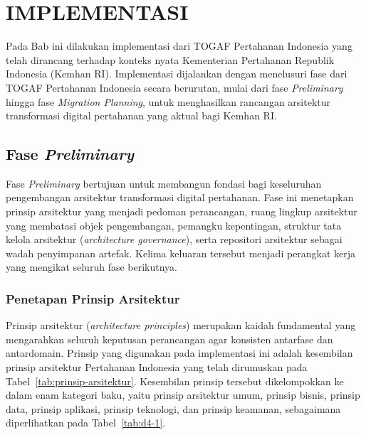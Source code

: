 \chapter{IMPLEMENTASI}
\label{chap:implementasi}

Pada Bab ini dilakukan implementasi dari TOGAF Pertahanan Indonesia yang telah dirancang terhadap konteks nyata Kementerian Pertahanan Republik Indonesia (Kemhan RI). Implementasi dijalankan dengan menelusuri fase dari TOGAF Pertahanan Indonesia secara berurutan, mulai dari fase \textit{Preliminary} hingga fase \textit{Migration Planning}, untuk menghasilkan rancangan arsitektur transformasi digital pertahanan yang aktual bagi Kemhan RI.

\section{Fase \textit{Preliminary}}

Fase \textit{Preliminary} bertujuan untuk membangun fondasi bagi keseluruhan pengembangan arsitektur transformasi digital pertahanan. Fase ini menetapkan prinsip arsitektur yang menjadi pedoman perancangan, ruang lingkup arsitektur yang membatasi objek pengembangan, pemangku kepentingan, struktur tata kelola arsitektur (\textit{architecture governance}), serta repositori arsitektur sebagai wadah penyimpanan artefak. Kelima keluaran tersebut menjadi perangkat kerja yang mengikat seluruh fase berikutnya.

\subsection{Penetapan Prinsip Arsitektur}

Prinsip arsitektur (\textit{architecture principles}) merupakan kaidah fundamental yang mengarahkan seluruh keputusan perancangan agar konsisten antarfase dan antardomain. Prinsip yang digunakan pada implementasi ini adalah kesembilan prinsip arsitektur Pertahanan Indonesia yang telah dirumuskan pada Tabel~\ref{tab:prinsip-arsitektur}. Kesembilan prinsip tersebut dikelompokkan ke dalam enam kategori baku, yaitu prinsip arsitektur umum, prinsip bisnis, prinsip data, prinsip aplikasi, prinsip teknologi, dan prinsip keamanan, sebagaimana diperlihatkan pada Tabel~\ref{tab:d4-1}.

